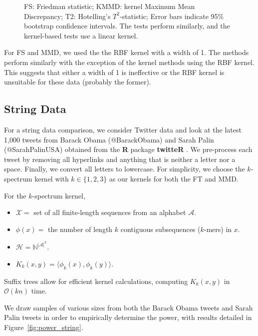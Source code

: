 \begin{figure}
  \begin{center}
    \resizebox{14.0cm}{!}{
      
    }
  \end{center}
  \caption{FS: Friedman statistic; KMMD: kernel Maximum Mean
    Discrepancy; T2: Hotelling's $T^2$-statistic; Error bars indicate
    95\% bootstrap confidence intervals.  The tests perform similarly,
    and the kernel-based tests use a linear kernel.}
  \label{fig:power_normal}
\end{figure}

For FS and MMD, we used the the RBF kernel with a width of 1.  The
methods perform similarly with the exception of the kernel methods
using the RBF kernel.  This suggests that either a width of 1 is
ineffective or the RBF kernel is unsuitable for these data (probably the former).

\subsection{String Data}
\label{twitter_data}
For a string data comparison, we consider Twitter data and look at the
latest 1,000 tweets from Barack Obama (@BarackObama) and Sarah Palin
(@SarahPalinUSA) obtained from the {\bf R} package {\bf twitteR}
\cite{twitteR}.  We pre-process each tweet by removing all
hyperlinks and anything that is neither a letter nor a space.
Finally, we convert all letters to lowercase.  For simplicity, we
choose the $k$-spectrum kernel \cite{leslie2002spectrum} with
$k \in \{1, 2, 3 \}$
as our kernels for both the FT and MMD.

For the $k$-spectrum kernel,
\begin{itemize}
\item $\mathcal{X} = $ set of all finite-length sequences from an alphabet $\mathcal{A}$.
\item $\phi(x) = $ the number of length $k$ contiguous subsequences ($k$-mers) in $x$.
\item $\mathcal{H} = \mathbb{N}^{|\mathcal{A}|^k}$.
\item $K_k(x,y) = \langle \phi_k(x), \phi_k(y) \rangle$.
\end{itemize}

Suffix trees allow for efficient kernel calculations, computing $K_k(x, y)$ in
$\mathcal{O}(kn)$ time.

We draw samples of various sizes from
both the Barack Obama tweets and Sarah Palin tweets in order to
empirically determine the power, with results detailed in
Figure~\ref{fig:power_string}.

